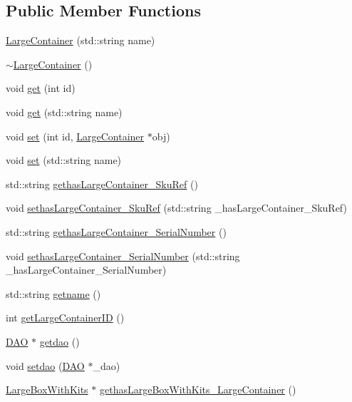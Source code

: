 \subsection*{Public Member Functions}
\begin{DoxyCompactItemize}
\item 
\hyperlink{class_large_container_aa1f5f968cfbb76680a8aa82584a7d62d}{LargeContainer} (std::string name)
\item 
\hyperlink{class_large_container_aa9a8712c74523b0c1a540ca6d62de357}{$\sim$LargeContainer} ()
\item 
void \hyperlink{class_large_container_ab3b3f779cf410f05c813e2621ee4dc81}{get} (int id)
\item 
void \hyperlink{class_large_container_a980f922e2d6f582e29bca54bf6c66a21}{get} (std::string name)
\item 
void \hyperlink{class_large_container_ae45d7af2528142bb69d74a1ed4f844bc}{set} (int id, \hyperlink{class_large_container}{LargeContainer} $\ast$obj)
\item 
void \hyperlink{class_large_container_af8dd74496296980354e2d45490f432ee}{set} (std::string name)
\item 
std::string \hyperlink{class_large_container_a13cf46910246355f3ee1b2deb9372d94}{gethasLargeContainer\_\-SkuRef} ()
\item 
void \hyperlink{class_large_container_ae7764a6bf3caf0447d21c3f00c26e14c}{sethasLargeContainer\_\-SkuRef} (std::string \_\-hasLargeContainer\_\-SkuRef)
\item 
std::string \hyperlink{class_large_container_a8b83eb36e084744de164f948915dc97f}{gethasLargeContainer\_\-SerialNumber} ()
\item 
void \hyperlink{class_large_container_a527f5a3249b5e39d7f52ae5d989c7d65}{sethasLargeContainer\_\-SerialNumber} (std::string \_\-hasLargeContainer\_\-SerialNumber)
\item 
std::string \hyperlink{class_large_container_a6274fe329979a63a5605cf39d9237ec0}{getname} ()
\item 
int \hyperlink{class_large_container_a5bb82a90023f406184bd30a6592e47b1}{getLargeContainerID} ()
\item 
\hyperlink{class_d_a_o}{DAO} $\ast$ \hyperlink{class_large_container_abbaf38c543fed531c22dcf208e57d16d}{getdao} ()
\item 
void \hyperlink{class_large_container_a5add50911868eaa39feafcf859a81b3a}{setdao} (\hyperlink{class_d_a_o}{DAO} $\ast$\_\-dao)
\item 
\hyperlink{class_large_box_with_kits}{LargeBoxWithKits} $\ast$ \hyperlink{class_large_container_a9e74a7240371b4f60deb2de33a18caef}{gethasLargeBoxWithKits\_\-LargeContainer} ()

\end{DoxyCompactItemize}
